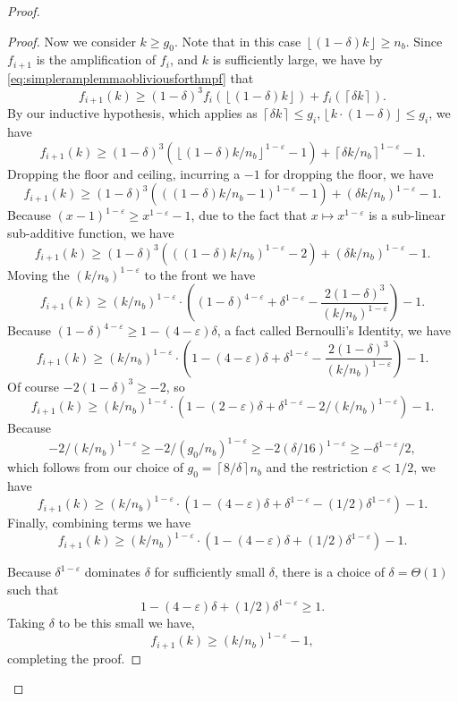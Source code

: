 \documentclass[twocolumn]{article}[10pt]
\newcommand{\floor}[1]{\left\lfloor #1 \right\rfloor}
\newcommand{\ceil}[1]{\left\lceil #1 \right\rceil}
\begin{document}
\begin{proof}
\begin{proof}
  Now we consider $k \ge g_0$. Note that in this case $\floor{(1-\delta)k} \ge n_b$.
  Since $f_{i+1}$ is the amplification of $f_i$, and $k$ is sufficiently large, we have by \eqref{eq:simpleramplemmaobliviousforthmpf} that
  $$f_{i+1}(k) \ge (1-\delta)^3 f_i(\floor{(1-\delta)k}) + f_i(\ceil{\delta k}).$$
  By our inductive hypothesis, which applies as $\ceil{\delta k}\le g_i, \floor{k\cdot (1-\delta)} \le g_i$, we have
  $$f_{i+1}(k) \ge (1-\delta)^3 (\floor{(1-\delta)k/n_b}^{1-\varepsilon}-1) + \ceil{\delta k/n_b}^{1-\varepsilon} - 1. $$
  Dropping the floor and ceiling, incurring a $-1$ for dropping the floor, we have
  $$f_{i+1}(k) \ge (1-\delta)^3 (((1-\delta)k/n_b-1)^{1-\varepsilon}-1) + (\delta k/n_b)^{1-\varepsilon} - 1.$$
  Because $(x-1)^{1-\varepsilon} \ge x^{1-\varepsilon} -1$, due to the
  fact that $x\mapsto x^{1-\varepsilon}$ is a sub-linear
  sub-additive function, we have 
  $$f_{i+1}(k) \ge (1-\delta)^3 (((1-\delta)k/n_b)^{1-\varepsilon}-2) + (\delta k/n_b)^{1-\varepsilon}-1.$$
  Moving the $(k/n_b)^{1-\varepsilon}$ to the front we have
  $$ f_{i+1}(k) \ge (k/n_b)^{1-\varepsilon} \cdot\left((1-\delta)^{4-\varepsilon} + \delta^{1-\varepsilon} - \frac{2(1-\delta)^3}{(k/n_b)^{1-\varepsilon}} \right) -1.$$
  Because $(1-\delta)^{4-\varepsilon} \ge 1-(4-\varepsilon)\delta$, a fact called Bernoulli's Identity, we have
  $$f_{i+1}(k) \ge (k/n_b)^{1-\varepsilon} \cdot\left(1-(4-\varepsilon)\delta + \delta^{1-\varepsilon} - \frac{2(1-\delta)^3}{(k/n_b)^{1-\varepsilon}} \right)-1.$$
  Of course $-2(1-\delta)^3 \ge -2$, so 
  $$f_{i+1}(k) \ge (k/n_b)^{1-\varepsilon} \cdot\left(1-(2-\varepsilon)\delta + \delta^{1-\varepsilon} - 2/(k/n_b)^{1-\varepsilon} \right) -1.$$
  Because $$-2/(k/n_b)^{1-\varepsilon} \ge -2/(g_0/n_b)^{1-\varepsilon} \ge
  -2(\delta/16)^{1-\varepsilon} \ge -\delta^{1-\varepsilon}/2,$$
  which follows from our choice of $g_0 = \ceil{8/\delta} n_b$ and the restriction
  $\varepsilon<1/2$, we have 
  $$f_{i+1}(k) \ge (k/n_b)^{1-\varepsilon} \cdot\left(1-(4-\varepsilon)\delta + \delta^{1-\varepsilon} - (1/2)\delta^{1-\varepsilon} \right)-1.$$
  Finally, combining terms we have
  $$f_{i+1}(k) \ge  (k/n_b)^{1-\varepsilon} \cdot\left(1-(4-\varepsilon)\delta + (1/2)\delta^{1-\varepsilon}\right)-1. $$

  Because $\delta^{1-\varepsilon}$ dominates $\delta$ for
  sufficiently small $\delta$, there is a choice of
  $\delta=\Theta(1)$ such that 
  $$1-(4-\varepsilon)\delta + (1/2)\delta^{1-\varepsilon} \ge 1.$$ 
  Taking $\delta$ to be this small we have,
  $$f_{i+1}(k) \ge (k/n_b)^{1-\varepsilon}-1,$$
  completing the proof. 
  \end{proof}


\end{proof}
\end{document}
